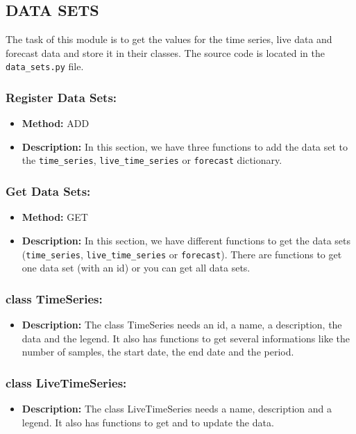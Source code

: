 \documentclass[11pt, a4paper]{article}
\begin{document}
\subsection{DATA SETS}
The task of this module is to get the values for the time series, live data and forecast data and store it in their classes.
The source code is located in the \texttt{data\_sets.py} file.

\subsubsection*{Register Data Sets:}
\begin{itemize}
 \item[] \textbf{Method:} ADD
 \item[] \textbf{Description:} In this section, we have three functions to add the data set to the \texttt{time\_series}, \texttt{live\_time\_series} or \texttt{forecast} dictionary.
\end{itemize}

\subsubsection*{Get Data Sets:}
\begin{itemize}
 \item[] \textbf{Method:} GET
 \item[] \textbf{Description:} In this section, we have different functions to get the data sets (\texttt{time\_series}, \texttt{live\_time\_series} or \texttt{forecast}). 
 There are functions to get one data set (with an id) or you can get all data sets.
\end{itemize}

\subsubsection*{class TimeSeries:}
\begin{itemize}
 \item[] \textbf{Description:} The class TimeSeries needs an id, a name, a description, the data and the legend. 
 It also has functions to get several informations like the number of samples, the start date, the end date and the period.
\end{itemize}

\subsubsection*{class LiveTimeSeries:}
\begin{itemize}
 \item[] \textbf{Description:} The class LiveTimeSeries needs a name, description and a legend.
 It also has functions to get and to update the data.
\end{itemize}
\end{document}
